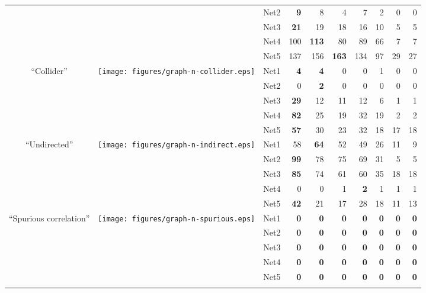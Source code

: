 \begin{table*}[t]
\begin{adjustbox}{max width=\textwidth}
\begin{tabular}{cccrrrrrrr}
  &   & Net2 & \textbf{9} & 8 & 4 & 7 & 2 & 0 & 0 \\
  &   & Net3 & \textbf{21} & 19 & 18 & 16 & 10 & 5 & 5 \\
  &   & Net4 & 100 & \textbf{113} & 80 & 89 & 66 & 7 & 7 \\
  &   & Net5 & 137 & 156 & \textbf{163} & 134 & 97 & 29 & 27 \\
\midrule
\multirow{5}{*}{``Collider''} & \multirow{5}{*}{\texttt{[image: figures/graph-n-collider.eps]}} & Net1 & \textbf{4} & \textbf{4} & 0 & 0 & 1 & 0 & 0 \\
  &   & Net2 & 0 & \textbf{2} & 0 & 0 & 0 & 0 & 0 \\
  &   & Net3 & \textbf{29} & 12 & 11 & 12 & 6 & 1 & 1 \\
  &   & Net4 & \textbf{82} & 25 & 19 & 32 & 19 & 2 & 2 \\
  &   & Net5 & \textbf{57} & 30 & 23 & 32 & 18 & 17 & 18 \\
\midrule
\multirow{5}{*}{``Undirected''} & \multirow{5}{*}{\texttt{[image: figures/graph-n-indirect.eps]}} & Net1 & 58 & \textbf{64} & 52 & 49 & 26 & 11 & 9 \\
  &   & Net2 & \textbf{99} & 78 & 75 & 69 & 31 & 5 & 5 \\
  &   & Net3 & \textbf{85} & 74 & 61 & 60 & 35 & 18 & 18 \\
  &   & Net4 & 0 & 0 & 1 & \textbf{2} & 1 & 1 & 1 \\
  &   & Net5 & \textbf{42} & 21 & 17 & 28 & 18 & 11 & 13 \\
\midrule
\multirow{5}{*}{``Spurious correlation''} & \multirow{5}{*}{\texttt{[image: figures/graph-n-spurious.eps]}} & Net1 & \textbf{0} & \textbf{0} & \textbf{0} & \textbf{0} & \textbf{0} & \textbf{0} & \textbf{0} \\
  &   & Net2 & \textbf{0} & \textbf{0} & \textbf{0} & \textbf{0} & \textbf{0} & \textbf{0} & \textbf{0} \\
  &   & Net3 & \textbf{0} & \textbf{0} & \textbf{0} & \textbf{0} & \textbf{0} & \textbf{0} & \textbf{0} \\
  &   & Net4 & \textbf{0} & \textbf{0} & \textbf{0} & \textbf{0} & \textbf{0} & \textbf{0} & \textbf{0} \\
  &   & Net5 & \textbf{0} & \textbf{0} & \textbf{0} & \textbf{0} & \textbf{0} & \textbf{0} & \textbf{0} \\
\midrule
\botrule
\end{tabular}\end{adjustbox}{}
\end{table*}

